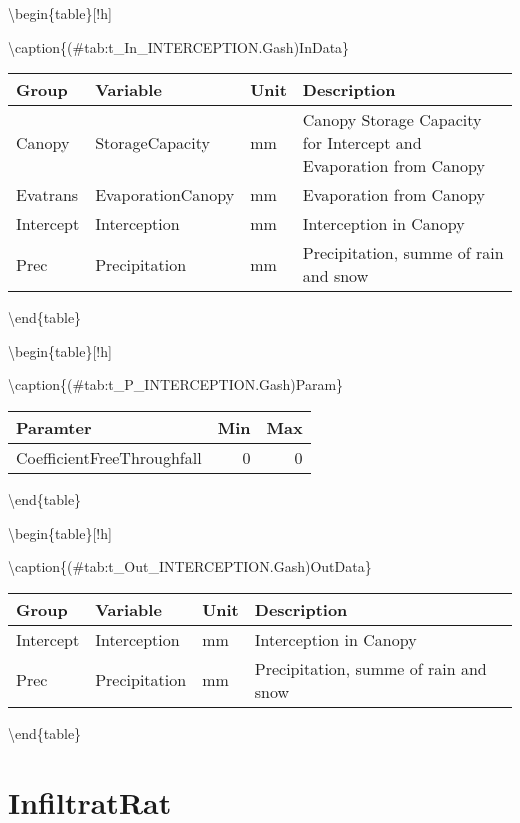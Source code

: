 \documentclass[
]{book}
\begin{document}
\textbackslash begin\{table\}{[}!h{]}

\textbackslash caption\{(\#tab:t\_In\_INTERCEPTION.Gash)InData\}
\centering

\begin{tabular}[t]{l|l|l|l}
\hline
Group & Variable & Unit & Description\\
\hline
Canopy & StorageCapacity & mm & Canopy Storage Capacity for Intercept and Evaporation from Canopy\\
\cline{1-4}
Evatrans & EvaporationCanopy & mm & Evaporation from Canopy\\
\cline{1-4}
Intercept & Interception & mm & Interception in Canopy\\
\cline{1-4}
Prec & Precipitation & mm & Precipitation, summe of rain and snow\\
\hline
\end{tabular}

\textbackslash end\{table\}

\textbackslash begin\{table\}{[}!h{]}

\textbackslash caption\{(\#tab:t\_P\_INTERCEPTION.Gash)Param\}
\centering

\begin{tabular}[t]{l|r|r}
\hline
Paramter & Min & Max\\
\hline
CoefficientFreeThroughfall & 0 & 0\\
\hline
\end{tabular}

\textbackslash end\{table\}

\textbackslash begin\{table\}{[}!h{]}

\textbackslash caption\{(\#tab:t\_Out\_INTERCEPTION.Gash)OutData\}
\centering

\begin{tabular}[t]{l|l|l|l}
\hline
Group & Variable & Unit & Description\\
\hline
Intercept & Interception & mm & Interception in Canopy\\
\cline{1-4}
Prec & Precipitation & mm & Precipitation, summe of rain and snow\\
\hline
\end{tabular}

\textbackslash end\{table\}

\hypertarget{infiltratrat}{%
\section{InfiltratRat}\label{infiltratrat}}
\end{document}
